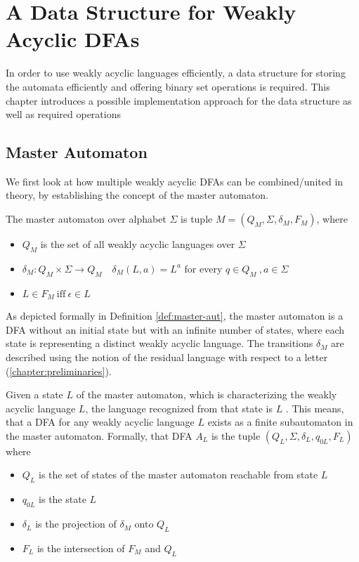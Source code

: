 \chapter{A Data Structure for Weakly Acyclic DFAs}\label{chapter:datastructure}

In order to use weakly acyclic languages efficiently, a data structure for storing the automata efficiently and offering binary set operations is required. This chapter introduces a possible implementation approach for the data structure as well as required operations

\section{Master Automaton}\label{sec:master-aut}
We first look at how multiple weakly acyclic DFAs can be combined/united in theory, by establishing the concept of the master automaton. 
\begin{definition}\label{def:master-aut}
The master automaton over alphabet $\Sigma$ is tuple $M = (Q_{M},\Sigma,\delta_{M},F_{M})$, where 
\begin{itemize}[--,noitemsep]
\item $Q_{M}$ is the set of all weakly acyclic languages over $\Sigma$
\item $\delta_{M}: Q_{M} \times \Sigma \rightarrow Q_{M} \quad \delta_{M}(L,a) = L^{a}$ for every $q \in Q_{M} \ , a \in \Sigma$
\item $L \in F_{M} \ \text{iff} \ \epsilon \in L$
\end{itemize}
\end{definition}
As depicted formally in Definition \autoref{def:master-aut}, the master automaton is a DFA without an initial state but with an infinite number of states, where each state is representing a distinct weakly acyclic language. The transitions $\delta_{M}$ are described using the notion of the residual language with respect to a letter (\autoref{chapter:preliminaries}).
\par
Given a state $L$ of the master automaton, which is characterizing the weakly acyclic language $L$, the language recognized from that state is $L$ \cite[Proposition~8]{blondin_24}. This means, that a DFA for any weakly acyclic language $L$ exists as a finite subautomaton in the master automaton. 
\newline
Formally, that DFA $A_{L}$ is the tuple $(Q_{L},\Sigma,\delta_{L},q_{0L},F_{L})$ where 
\begin{itemize}[--,noitemsep]
\item $Q_{L}$ is the set of states of the master automaton reachable from state $L$
\item $q_{0L}$ is the state $L$
\item $\delta_{L}$ is the projection of $\delta_{M}$ onto $Q_{L}$
\item $F_{L}$ is the intersection of $F_{M}$ and $Q_{L}$
\end{itemize}
